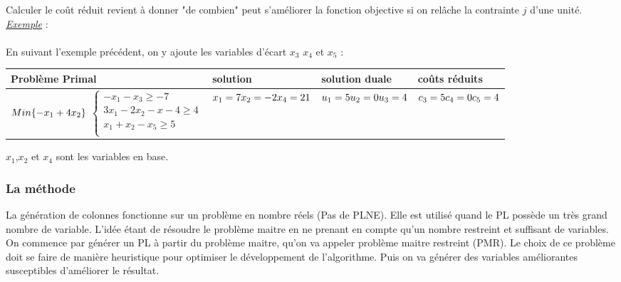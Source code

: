 Calculer le coût réduit revient à donner "de combien" peut s'améliorer la fonction objective si on relâche la contrainte $j$ d'une unité.
\newline
\\
\underline{\textit{Exemple}} : \\
\\
En suivant l'exemple précédent, on y ajoute les variables d'écart $x_3$ $x_4$ et $x_5$ :\\

\begin{tabular}{ p{5 cm}p{3 cm}p{3 cm}p{3 cm}}
 \hline
Problème Primal  & solution & solution duale & coûts réduits \\
 \hline
$Min\{-x_1 + 4x_2\} \newline$
$\left\lbrace
\begin{array}{l}
-x_1 -x_3\geq -7\\
3x_1-2x_2 -x -4\geq 4\\
x_1+x_2 -x_5 \geq 5\\
\end{array}
\right.$
& $x_1 = 7 \newline x_2 = -2 \newline x_4 = 21$ & $u_1 = 5 \newline u_2 = 0 \newline u_3 = 4$ & $c_3 = 5 \newline c_4 = 0 \newline c_5 = 4$ \\
 \hline
\end{tabular}

$x_1$,$x_2$ et $x_4$ sont les variables en base.
\subsubsection{La méthode}
La génération de colonnes fonctionne sur un problème en nombre réels (Pas de PLNE). Elle est utilisé quand le PL possède un très grand nombre de variable. L'idée étant de résoudre le problème maitre en ne prenant en compte qu'un nombre restreint et suffisant de variables.\\

On commence par générer un PL à partir du problème maitre, qu'on va appeler problème maitre restreint (PMR). Le choix de ce problème doit se faire de manière heuristique pour optimiser le développement de l'algorithme. Puis on va générer des variables améliorantes susceptibles d'améliorer le résultat.\\

